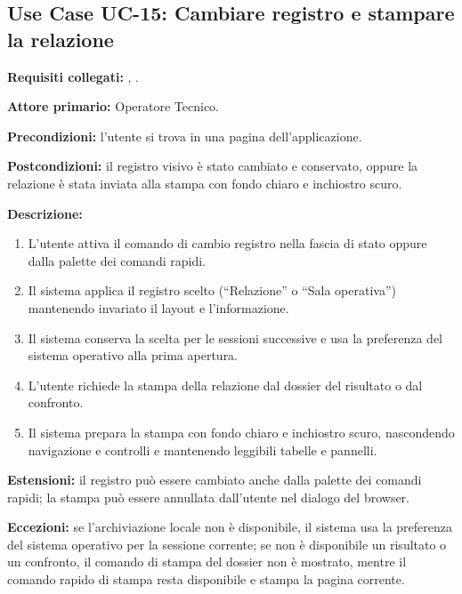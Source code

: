 \subsection*{Use Case UC-15: Cambiare registro e stampare la relazione}
\textbf{Requisiti collegati:} , .\par
\textbf{Attore primario:} Operatore Tecnico.\par
\textbf{Precondizioni:} l'utente si trova in una pagina dell'applicazione.\par
\textbf{Postcondizioni:} il registro visivo è stato cambiato e conservato, oppure la relazione è stata inviata alla stampa con fondo chiaro e inchiostro scuro.\par
\textbf{Descrizione:}
\begin{enumerate}[leftmargin=1.6em, itemsep=0.1em]
    \item L'utente attiva il comando di cambio registro nella fascia di stato oppure dalla palette dei comandi rapidi.
    \item Il sistema applica il registro scelto (``Relazione'' o ``Sala operativa'') mantenendo invariato il layout e l'informazione.
    \item Il sistema conserva la scelta per le sessioni successive e usa la preferenza del sistema operativo alla prima apertura.
    \item L'utente richiede la stampa della relazione dal dossier del risultato o dal confronto.
    \item Il sistema prepara la stampa con fondo chiaro e inchiostro scuro, nascondendo navigazione e controlli e mantenendo leggibili tabelle e pannelli.
\end{enumerate}
\textbf{Estensioni:} il registro può essere cambiato anche dalla palette dei comandi rapidi; la stampa può essere annullata dall'utente nel dialogo del browser.\par
\textbf{Eccezioni:} se l'archiviazione locale non è disponibile, il sistema usa la preferenza del sistema operativo per la sessione corrente; se non è disponibile un risultato o un confronto, il comando di stampa del dossier non è mostrato, mentre il comando rapido di stampa resta disponibile e stampa la pagina corrente.
